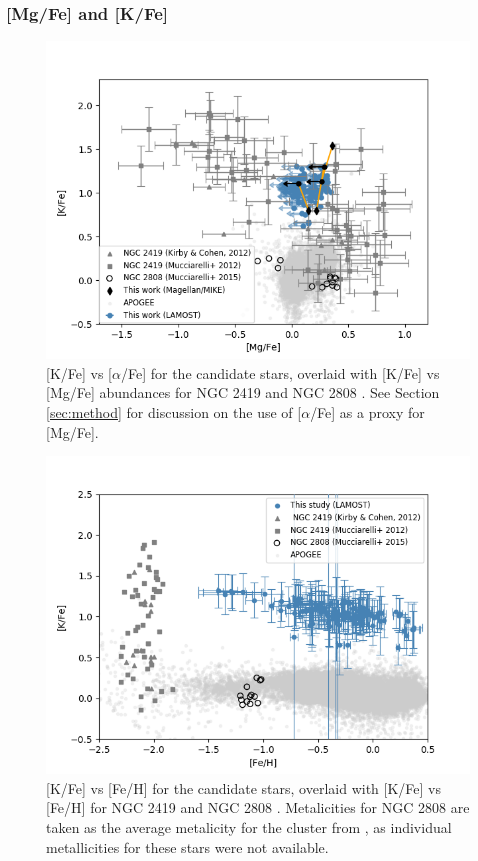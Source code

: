 \documentclass[a4paper,fleqn,usenatbib]{mnras}
\begin{document}
\subsubsection{[Mg/Fe] and [K/Fe]}

\begin{figure}
	\includegraphics[width=\columnwidth]{KvsMg.png}
    \caption{[K/Fe] vs [$\alpha$/Fe] for the candidate stars, overlaid with [K/Fe] vs [Mg/Fe] abundances for NGC 2419 and NGC 2808 \citep{cohenkirby2012, mucciarelli2012, mucciarelli2015}. See Section \ref{sec:method} for discussion on the use of [$\alpha$/Fe] as a proxy for [Mg/Fe].} 
    \label{KvsMg}
\end{figure}

\begin{figure}
	\includegraphics[width=\columnwidth]{KvsFe.png}
    \caption{[K/Fe] vs [Fe/H] for the candidate stars, overlaid with [K/Fe] vs [Fe/H] for NGC 2419 and NGC 2808 \citep{cohenkirby2012, mucciarelli2012, mucciarelli2015}. Metalicities for NGC 2808 are taken as the average metalicity for the cluster from \citet{harris1996}, as individual metallicities for these stars were not available.}
    \label{KvsFe}
\end{figure}
\end{document}
